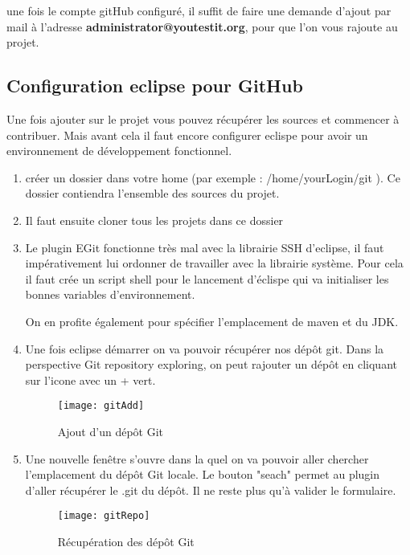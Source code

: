 une fois le compte gitHub configuré, il suffit de faire une demande d'ajout par mail à l'adresse
\textbf{administrator@youtestit.org}, pour que l'on vous rajoute au projet.

\subsection{Configuration eclipse pour GitHub}
Une fois ajouter sur le projet  vous pouvez récupérer les sources et commencer à contribuer. 
Mais avant cela il faut encore configurer eclispe pour avoir un environnement de développement
fonctionnel. 

\begin{enumerate}
	\item créer un dossier dans votre home (par exemple : /home/yourLogin/git ). Ce dossier contiendra
	 l'ensemble des sources du projet.
	 
	\item Il faut ensuite cloner tous les projets dans ce dossier
	 
	 
	 \item Le plugin EGit fonctionne très mal avec la librairie SSH d'eclipse, il faut impérativement lui
	 ordonner de travailler avec la librairie système. Pour cela il faut  crée un script shell pour le lancement
	 d'éclispe qui va initialiser les bonnes variables d'environnement.
	 
	 
	On en profite également pour spécifier l'emplacement de maven et du JDK.
	\newpage

	 \item Une fois eclipse démarrer on va pouvoir récupérer nos dépôt git. Dans la perspective
	 Git repository exploring, on peut rajouter un dépôt en cliquant sur l'icone avec un + vert.
		\begin{figure}[!h]
     		\begin{center}
			      \texttt{[image: gitAdd]}
			      \caption{Ajout d'un dépôt Git}
			      \label{gitAdd}
		    \end{center}
		\end{figure}
		
	 \item Une nouvelle fenêtre s'ouvre dans la quel on va pouvoir aller chercher  l'emplacement du
	 dépôt Git locale. Le bouton "seach" permet au plugin d'aller récupérer le .git du dépôt. Il ne 
	 reste plus qu'à valider le formulaire.
		\begin{figure}[!h]
     		\begin{center}
			      \texttt{[image: gitRepo]}
			      \caption{Récupération des dépôt Git}
			      \label{gitAddRepo}
		    \end{center}
		\end{figure}	
		\newpage
	 

\end{enumerate}
